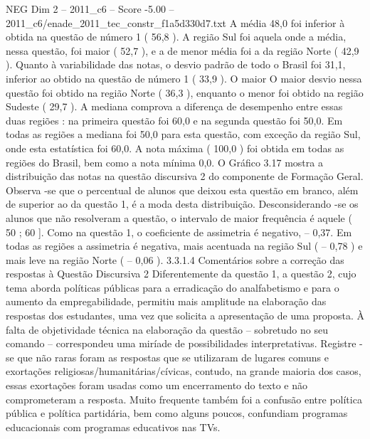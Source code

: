 \begin{textsample}{NEG Dim 2 – 2011\_c6 – Score -5.00 – 2011\_c6/enade\_2011\_tec\_constr\_f1a5d330d7.txt}
A média 48,0 foi inferior à obtida na questão de número 1 ( 56,8 ).
A região Sul foi aquela onde a média, nessa questão, foi maior ( 52,7 ), e a de menor média foi a da região Norte ( 42,9 ).
Quanto à variabilidade das notas, o desvio padrão de todo o Brasil foi 31,1, inferior ao obtido na questão de número 1 ( 33,9 ).
O maior O maior desvio nessa questão foi obtido na região Norte ( 36,3 ), enquanto o menor foi obtido na região Sudeste ( 29,7 ).
A mediana comprova a diferença de desempenho entre essas duas regiões : na primeira questão foi 60,0 e na segunda questão foi 50,0.
Em todas as regiões a mediana foi 50,0 para esta questão, com exceção da região Sul, onde esta estatística foi 60,0.
A nota máxima ( 100,0 ) foi obtida em todas as regiões do Brasil, bem como a nota mínima 0,0.
O Gráfico 3.17 mostra a distribuição das notas na questão discursiva 2 do componente de Formação Geral.
Observa -se que o percentual de alunos que deixou esta questão em branco, além de superior ao da questão 1, é a moda desta distribuição.
Desconsiderando -se os alunos que não resolveram a questão, o intervalo de maior frequência é aquele ( 50 ; 60 ].
Como na questão 1, o coeficiente de assimetria é negativo, – 0,37.
Em todas as regiões a assimetria é negativa, mais acentuada na região Sul ( – 0,78 ) e mais leve na região Norte ( – 0,06 ). 3.3.1.4 Comentários sobre a correção das respostas à Questão Discursiva 2 Diferentemente da questão 1, a questão 2, cujo tema aborda políticas públicas para a erradicação do analfabetismo e para o aumento da empregabilidade, permitiu mais amplitude na elaboração das respostas dos estudantes, uma vez que solicita a apresentação de uma proposta.
À falta de objetividade técnica na elaboração da questão – sobretudo no seu comando – correspondeu uma miríade de possibilidades interpretativas.
Registre -se que não raras foram as respostas que se utilizaram de lugares comuns e exortações religiosas/humanitárias/cívicas, contudo, na grande maioria dos casos, essas exortações foram usadas como um encerramento do texto e não comprometeram a resposta.
Muito frequente também foi a confusão entre política pública e política partidária, bem como alguns poucos, confundiam programas educacionais com programas educativos nas TVs.

\end{textsample}
